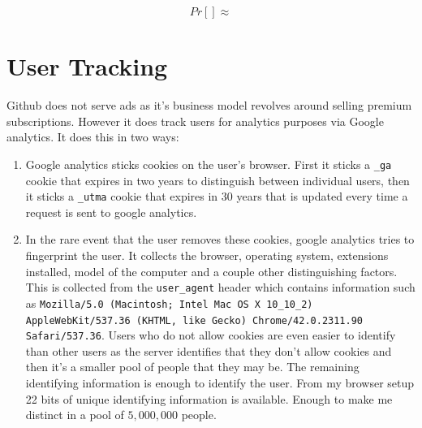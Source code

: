\documentclass{lposter}
\theoremstyle{plain}
\theoremstyle{definition}
\renewcommand{\tt}[1]{\texttt{#1}}
\begin{document}
\begin{poster}
$$Pr[] \approx$$




\section{User Tracking}
Github does not serve ads as it's business model revolves around selling premium subscriptions. However it does track users for analytics purposes via Google analytics. It does this in two ways:

\begin{enumerate}
\item Google analytics sticks cookies on the user's browser. First it sticks a \tt{\_ga} cookie that expires in two years to distinguish between individual users, then it sticks a \tt{\_utma} cookie that expires in 30 years that is updated every time a request is sent to google analytics. %
\item In the rare event that the user removes these cookies, google analytics tries to fingerprint the user. It collects the browser, operating system, extensions installed, model of the computer and a couple other distinguishing factors. This is collected from the \tt{user\_agent} header which contains information such as \tt{Mozilla/5.0 (Macintosh; Intel Mac OS X 10\_10\_2) AppleWebKit/537.36 (KHTML, like Gecko) Chrome/42.0.2311.90 Safari/537.36}. Users who do not allow cookies are even easier to identify than other users as the server identifies that they don't allow cookies and then it's a smaller pool of people that they may be. The remaining identifying information is enough to identify the user. From my browser setup 22 bits of unique identifying information is available. Enough to make me distinct in a pool of $5,000,000$ people.

\begin{figure}




\end{figure}
\end{enumerate}
\end{poster}
\end{document}
